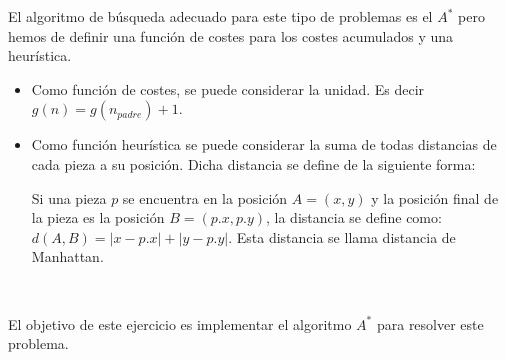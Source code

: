 El algoritmo de búsqueda adecuado para este tipo de problemas es el $A^*$ pero hemos de definir una función de costes para los costes acumulados y una heurística.

\begin{itemize}
\item 
Como función de costes, se puede considerar la unidad. Es decir $g(n)=g(n_{padre}) + 1$.

\item 
Como función heurística se puede considerar la suma de todas distancias de cada pieza a su posición. Dicha distancia se define de la siguiente forma:

Si una pieza $p$ se encuentra en la posición $A=(x, y)$ y la posición final de la pieza es la posición $B=(p.x, p.y)$, la distancia se define como:
$
d(A, B) = |x-p.x| + |y-p.y|
$.
Esta distancia se llama distancia de Manhattan.
\end{itemize}

\

El objetivo de este ejercicio es implementar el algoritmo $A^*$ para resolver este problema.

 

%







\separacion


